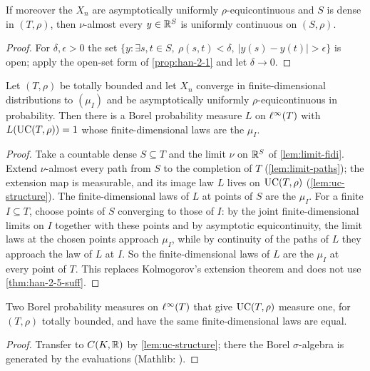 \begin{lemma}
  \label{lem:limit-paths}
  If moreover the $X_n$ are asymptotically uniformly $\rho$-equicontinuous and $S$ is dense in $(T,\rho)$, then $\nu$-almost every $y\in\mathbb{R}^S$ is uniformly continuous on $(S,\rho)$.
\end{lemma}
\begin{proof}
  For $\delta,\epsilon>0$ the set $\{y:\exists s,t\in S,\ \rho(s,t)<\delta,\ |y(s)-y(t)|>\epsilon\}$ is open; apply the open-set form of \cref{prop:han-2-1} and let $\delta\to0$.
\end{proof}

\begin{theorem}
  \label{thm:limit-exists}
  Let $(T,\rho)$ be totally bounded and let $X_n$ converge in finite-dimensional distributions to $(\mu_I)$ and be asymptotically uniformly $\rho$-equicontinuous in probability. Then there is a Borel probability measure $L$ on $\ell^\infty(T)$ with $L(\mathrm{UC}(T,\rho))=1$ whose finite-dimensional laws are the $\mu_I$.
\end{theorem}
\begin{proof}
  Take a countable dense $S\subseteq T$ and the limit $\nu$ on $\mathbb{R}^S$ of \cref{lem:limit-fidi}. Extend $\nu$-almost every path from $S$ to the completion of $T$ (\cref{lem:limit-paths}); the extension map is measurable, and its image law $L$ lives on $\mathrm{UC}(T,\rho)$ (\cref{lem:uc-structure}). The finite-dimensional laws of $L$ at points of $S$ are the $\mu_I$. For a finite $I\subseteq T$, choose points of $S$ converging to those of $I$: by the joint finite-dimensional limits on $I$ together with these points and by asymptotic equicontinuity, the limit laws at the chosen points approach $\mu_I$, while by continuity of the paths of $L$ they approach the law of $L$ at $I$. So the finite-dimensional laws of $L$ are the $\mu_I$ at every point of $T$. This replaces Kolmogorov's extension theorem and does not use \cref{thm:han-2-5-suff}.
\end{proof}

\begin{lemma}
  \label{lem:limit-unique}
  Two Borel probability measures on $\ell^\infty(T)$ that give $\mathrm{UC}(T,\rho)$ measure one, for $(T,\rho)$ totally bounded, and have the same finite-dimensional laws are equal.
\end{lemma}
\begin{proof}
  Transfer to $C(K,\mathbb{R})$ by \cref{lem:uc-structure}; there the Borel $\sigma$-algebra is generated by the evaluations (Mathlib: ).
\end{proof}

